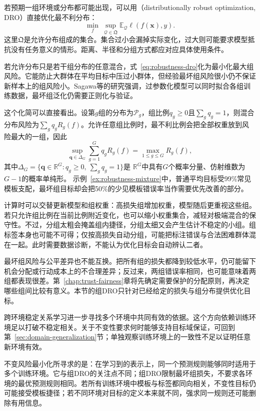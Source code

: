 若预期一组环境或分布都可能出现，可以用（distributionally robust optimization, DRO）直接优化最不利分布：
\begin{equation}
 \min_f\ \sup_{\mathcal Q\in\mathfrak Q}
   \mathbb E_{\mathcal Q}\ell(f(\bm{x}),y).
 \label{eq:robustness-dro}
\end{equation}
这里$\mathfrak Q$是允许分布组成的集合。集合过小会漏掉实际变化，过大则可能要求模型抵抗没有任务意义的情形。距离、半径和分组方式都应对应具体使用条件。

若允许分布只是若干组分布的任意混合，式~\eqref{eq:robustness-dro}化为最小化最大组风险。它能防止大群体在平均目标中压过小群体，但经验最坏组风险很小仍不保证新样本上的组风险小。Sagawa等的研究强调，过参数化模型可以同时拟合各组训练数据，最坏组泛化仍需要正则化与验证。

这个化简可以直接看出。设第$g$组的分布为$\mathcal P_g$，组比例$q_g\geq0$且$\sum_gq_g=1$，则混合分布风险为$\sum_gq_gR_g(f)$。允许任意组比例时，最不利比例会把全部权重放到风险最大的一组，因此
\begin{equation}
 \sup_{\bm{q}\in\Delta_G}\sum_{g=1}^{G}q_gR_g(f)
       =\max_{1\leq g\leq G}R_g(f),
 \label{eq:robustness-group-dro}
\end{equation}
其中$\Delta_G=\{\bm q\in\mathbb R^G:q_g\geq0,\ \sum_gq_g=1\}$是
$\mathbb R^G$中具有$G$个概率分量、仿射维数为$G-1$的概率单纯形。
示例~\ref{ex:robustness-mixture}中，普通平均目标受99\%常见模板支配，最坏组目标却会把50\%的少见模板错误率当作需要优先改善的部分。

计算时可以交替更新模型和组权重：高损失组增加权重，模型随后更重视这些组。若只允许组比例在当前比例附近变化，也可以缩小权重集合，减轻对极端混合的保守性。不过，分组太粗会掩盖组内捷径，分组太细又会产生估计不稳定的小组。组标签本身也可能不可得；仅按高损失自动分组，可能把标注错误与合法困难群体混在一起。此时需要数据诊断，不能认为优化目标会自动辨认二者。

最坏组风险与公平差异也不能互换。把所有组的损失都降到较低水平，仍可能留下机会分配或行动成本上的不合理差异；反过来，两组错误率相同，也可能意味着两组都表现很差。第~\ref{chap:trust-fairness}章将先确定需要保护的分配原则，再决定哪些组间比较有意义。本节的组DRO只针对已经给定的损失与组分布提供优化目标。

跨环境稳定关系学习进一步寻找多个环境中共同有效的依据。这个方向依赖训练环境足以打破不稳定相关。关于不变性要求何时能够支持目标域保证，可回到第~\ref{sec:domain-generalization}节；单独观察训练环境上的一致性不足以证明任意新环境有效。

不变风险最小化所寻求的是：在学习到的表示上，同一个预测规则能够同时适用于多个训练环境。它与组DRO的关注点不同；组DRO限制最坏组损失，不要求各环境的最优预测规则相同。若所有训练环境中模板与标签都同向相关，不变性目标仍可能接受模板捷径；若不同环境对目标的定义本来就不同，强求同一规则还可能删除有用信息。


